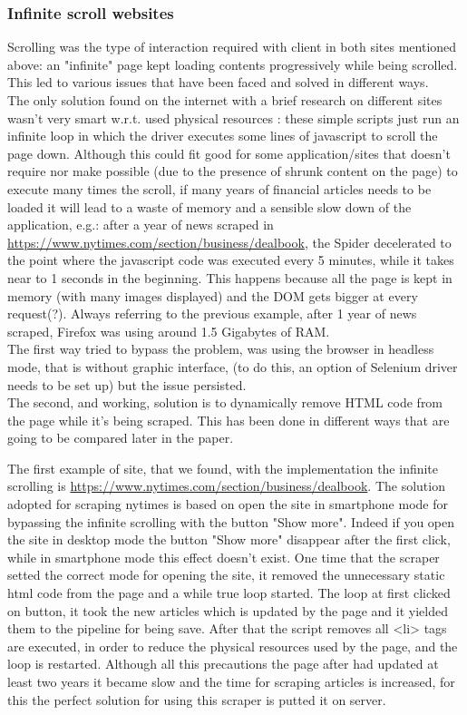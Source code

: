 \subsubsection{Infinite scroll websites}
Scrolling was the type of interaction required with client in both sites mentioned above: an "infinite" page kept loading contents progressively while being scrolled. This led to various issues that have been faced and solved in different ways. \\
The only solution found on the internet with a brief research on different sites wasn't very smart w.r.t. used physical resources \cite{currentscrollsolution}: these simple scripts just run an infinite loop in which the driver executes some lines of javascript to scroll the page down. Although this could fit good for some application/sites that doesn't require nor make possible (due to the presence of shrunk content on the page) to execute many times the scroll, if many years of financial articles needs to be loaded it will lead to a waste of memory and a sensible slow down of the application, e.g.:  after a year of news scraped in \url{https://www.nytimes.com/section/business/dealbook}, the Spider decelerated to the point where the javascript code was executed every 5 minutes, while it takes near to 1 seconds in the beginning. This happens because all the page is kept in memory (with many images displayed) and the DOM gets bigger at every request(?). Always referring to the previous example, after 1 year of news scraped, Firefox was using around 1.5 Gigabytes of RAM. \\
The first way tried to bypass the problem, was using the browser in headless mode, that is without graphic interface, (to do this, an option of Selenium driver needs to be set up) but the issue persisted. \\
The second, and working, solution is to dynamically remove HTML code from the page while it's being scraped. This has been done in different ways that are going to be compared later in the paper. 
\par 
The first example of site, that we found, with the implementation the infinite scrolling is \url{https://www.nytimes.com/section/business/dealbook}. The solution adopted for scraping nytimes is based on open the site in smartphone mode for bypassing the infinite scrolling with the button "Show more". Indeed if you open the site in desktop mode the button "Show more" disappear after the first click, while in smartphone mode this effect doesn't exist. One time that the scraper setted the correct mode for opening the site, it removed the unnecessary static html code from the page and a while true loop started. The loop at first clicked on button, it took the new articles which is updated by the page and it yielded them to the pipeline for being save. After that the script removes all <li> tags are executed, in order to reduce the physical resources used by the page, and the loop is restarted. Although all this precautions the page after had updated at least two years it became slow and the time for scraping articles is increased, for this the perfect solution for using this scraper is putted it on server.   
